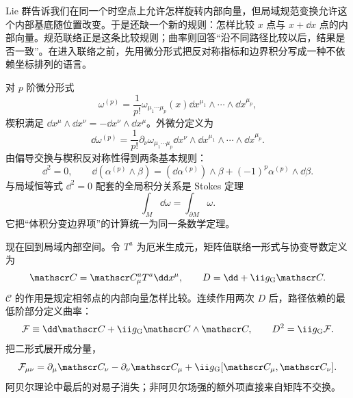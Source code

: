 Lie 群告诉我们在同一个时空点上允许怎样旋转内部向量，但局域规范变换允许这个内部基底随位置改变。于是还缺一个新的规则：怎样比较 $x$ 点与 $x+\dd x$ 点的内部向量。规范联络正是这条比较规则；曲率则回答“沿不同路径比较以后，结果是否一致”。在进入联络之前，先用微分形式把反对称指标和边界积分写成一种不依赖坐标排列的语言。

对 $p$ 阶微分形式
\begin{equation*}
 \omega^{(p)}
 =\frac1{p!}\omega_{\mu_1\cdots\mu_p}(x)
 \dd x^{\mu_1}\wedge\cdots\wedge\dd x^{\mu_p},
\end{equation*}
楔积满足 $\dd x^\mu\wedge\dd x^\nu=-\dd x^\nu\wedge\dd x^\mu$。外微分定义为
\begin{equation}
 \dd\omega^{(p)}
 =\frac1{p!}\partial_\nu\omega_{\mu_1\cdots\mu_p}
 \dd x^\nu\wedge\dd x^{\mu_1}\wedge\cdots\wedge\dd x^{\mu_p}.
 \label{eq:exterior-derivative-definition-dp68}
\end{equation}
由偏导交换与楔积反对称性得到两条基本规则：
\begin{equation}
 {
 \dd^2=0,
 \qquad
 \dd(\alpha^{(p)}\wedge\beta)
 =(\dd\alpha^{(p)})\wedge\beta
 +(-1)^p\alpha^{(p)}\wedge\dd\beta.}
 \label{eq:exterior-calculus-identities-dp68}
\end{equation}
与局域恒等式 $\dd^2=0$ 配套的全局积分关系是 Stokes 定理
\begin{equation}
 {\displaystyle \int_M\dd\omega=\int_{\partial M}\omega.}
 \label{eq:stokes-forms-dp11}
\end{equation}
它把“体积分变边界项”的计算统一为同一条数学定理。

现在回到局域内部空间。令 $T^a$ 为厄米生成元，矩阵值联络一形式与协变导数定义为
\begin{equation}
 {
 \mathscr C=\mathscr C_\mu^aT^a\dd x^\mu,
 \qquad
 D=\dd+\ii g_{\rm G}\mathscr C.}
 \label{eq:connection-oneform-dp11}
\end{equation}
$\mathscr C$ 的作用是规定相邻点的内部向量怎样比较。连续作用两次 $D$ 后，路径依赖的最低阶部分定义曲率：
\begin{equation}
 {
 \mathcal F\equiv\dd\mathscr C+\ii g_{\rm G}\mathscr C\wedge\mathscr C,
 \qquad
 D^2=\ii g_{\rm G}\mathcal F.}
 \label{eq:curvature-form-dp11}
\end{equation}
把二形式展开成分量，
\begin{equation}
 {
 \mathcal F_{\mu\nu}
 =\partial_\mu\mathscr C_\nu-\partial_\nu\mathscr C_\mu
 +\ii g_{\rm G}[\mathscr C_\mu,\mathscr C_\nu].}
 \label{eq:curvature-components-dp68}
\end{equation}
阿贝尔理论中最后的对易子消失；非阿贝尔场强的额外项直接来自矩阵不交换。

